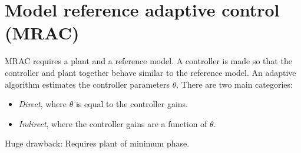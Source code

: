 \section{Model reference adaptive control (MRAC)}
MRAC requires a plant and a reference model. A controller is made so that the controller and plant together behave similar to the reference model. An adaptive algorithm estimates the controller parameters $\theta$. There are two main categories:
\begin{itemize}
	\item \emph{Direct}, where $\theta$ is equal to the controller gains.
	\item \emph{Indirect}, where the controller gains are a function of $\theta$.
\end{itemize}
Huge drawback: Requires plant of minimum phase.